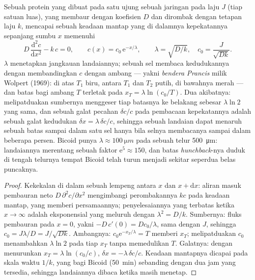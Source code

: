\begin{theorem}\label{thm:b3:developmental-genetics:gradient}
%
Sebuah protein yang dibuat pada satu ujung sebuah jaringan pada laju $J$ (tiap satuan luas),
yang membaur dengan koefisien $D$ dan dirombak dengan tetapan laju $k$,
mencapai sebuah keadaan mantap yang di dalamnya kepekatannya sepanjang sumbu $x$
memenuhi
\[
D\,\frac{\mathrm{d}^{2}c}{\mathrm{d}x^{2}} - k\,c = 0,
\qquad c(x) = c_{0}\,\mathrm{e}^{-x/\lambda}, \qquad \lambda = \sqrt{D/k},
\quad c_{0} = \frac{J}{\sqrt{Dk}} .
\]
\emph{} $\lambda$ menetapkan jangkauan landaiannya; sebuah sel
membaca kedudukannya dengan membandingkan $c$ dengan ambang --- yakni
\emph{bendera Prancis} milik Wolpert (1969): di atas $T_{1}$ biru, antara
$T_{1}$ dan $T_{2}$ putih, di bawahnya merah --- dan batas bagi ambang
$T$ terletak pada $x_{T} = \lambda\ln(c_{0}/T)$. Dua akibatnya: melipatduakan
sumbernya menggeser tiap batasnya ke belakang sebesar $\lambda\ln 2$ yang sama, dan sebuah
galat pecahan $\delta c/c$ pada pembacaan kepekatannya adalah sebuah galat
kedudukan $\delta x = \lambda\,\delta c/c$, sehingga sebuah landaian dapat
menaruh sebuah batas sampai dalam satu sel hanya bila selnya membacanya sampai dalam
beberapa persen. Bicoid punya $\lambda \approx \qty{100}{\micro m}$ pada sebuah
telur \qty{500}{\micro m}: landaiannya merentang sebuah faktor $\mathrm{e}^{5}
\approx 150$, dan batas \emph{hunchback}-nya duduk di tengah telurnya tempat
Bicoid telah turun menjadi sekitar seperdua belas puncaknya.
\end{theorem}
\begin{proof}
Kekekalan di dalam sebuah lempeng antara $x$ dan $x + \mathrm{d}x$: aliran masuk
pembauran neto $D\,\partial^{2}c/\partial x^{2}$ mengimbangi
perombakannya $kc$ pada keadaan mantap, yang memberi persamaannya; penyelesaiannya
yang terbatas ketika $x \to \infty$ adalah eksponensial yang meluruh dengan
$\lambda^{2} = D/k$. Sumbernya: fluks pembauran pada $x = 0$, yakni $-D\,
c'(0) = Dc_{0}/\lambda$, sama dengan $J$, sehingga $c_{0} = J\lambda/D =
J/\sqrt{Dk}$. Ambangnya: $c_{0}\mathrm{e}^{-x_{T}/\lambda} = T$ memberi
$x_{T}$; melipatduakan $c_{0}$ menambahkan $\lambda\ln 2$ pada tiap $x_{T}$
tanpa memedulikan $T$. Galatnya: dengan menurunkan $x_{T} = \lambda\ln(c_{0}/c)$,
$\delta x = -\lambda\,\delta c/c$. Keadaan mantapnya dicapai pada
skala waktu $1/k$, yang bagi Bicoid (\qty{50}{min}) sebanding dengan
dua jam yang tersedia, sehingga landaiannya dibaca ketika masih menetap.
\end{proof}

